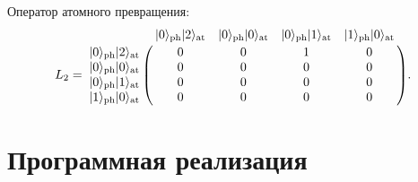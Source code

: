 \noindent Оператор атомного превращения:\\
{\normalsize
\begin{equation}\label{ch:L2}
	L_{2} = \bordermatrix
	{
		&                |0\ra_{\text{\text{ph}}}|2\ra_{\text{\text{at}}} & |0\ra_{\text{\text{ph}}}|0\ra_{\text{\text{at}}} & |0\ra_{\text{\text{ph}}}|1\ra_{\text{\text{at}}} & |1\ra_{\text{\text{ph}}}|0\ra_{\text{\text{at}}} \cr
		|0\ra_{\text{\text{ph}}}|2\ra_{\text{\text{at}}} &      0 &      0 &      1 & 0 \cr
		|0\ra_{\text{\text{ph}}}|0\ra_{\text{\text{at}}} &      0 &      0 &      0 & 0\cr
		|0\ra_{\text{\text{ph}}}|1\ra_{\text{\text{at}}} &      0 &      0 &      0 & 0\cr
		|1\ra_{\text{\text{ph}}}|0\ra_{\text{\text{at}}} &      0 &      0 &      0 & 0\cr
	}.
\end{equation}
}

\clearpage
\section{Программная реализация}

